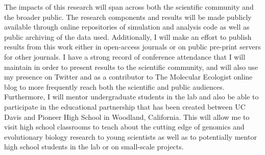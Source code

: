 The impacts of this research will span across both the scientific community and the broader public. The research components and results will be made publicly available  through online repositories of simulation and analysis code as well as public archiving of the data used. Additionally, I will make an effort to publish results from this work either in open-access journals %
or on public pre-print servers for other journals. I have a strong record of conference attendance that I will maintain in order to present results to the scientific community, and will also use my presence on Twitter and as a contributor to The Molecular Ecologist online blog to more frequently reach both the scientific and public audiences. Furthermore, I will mentor undergraduate students in the lab and also be able to participate in the educational partnership that has been created between UC Davis and Pioneer High School in Woodland, California. This will allow me to visit high school classrooms to teach about the cutting edge of genomics and evolutionary biology research to young scientists as well as to potentially mentor high school students in the lab or on small-scale projects. %

